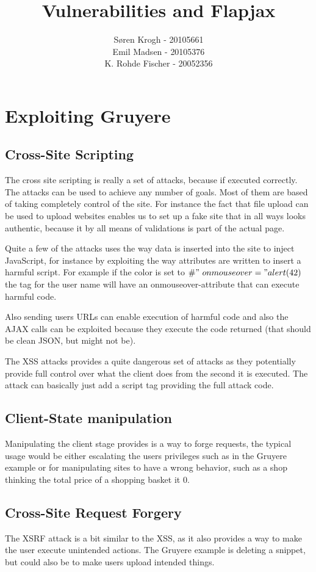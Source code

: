 \documentclass[a4paper,10pt]{article}
\title{Vulnerabilities and Flapjax}
\author{Søren Krogh -  20105661 \\
Emil Madsen - 20105376  \\
K. Rohde Fischer - 20052356\\}
\begin{document}
\maketitle

\section*{Exploiting Gruyere}
\subsection*{Cross-Site Scripting}
The cross site scripting is really a set of attacks, because if
executed correctly.  The attacks can be used to achieve any number of
goals.  Most of them are based of taking completely control of the
site.  For instance the fact that file upload can be used to upload
websites enables us to set up a fake site that in all ways looks
authentic, because it by all means of validations is part of the
actual page.

Quite a few of the attacks uses the way data is inserted into the site
to inject JavaScript, for instance by exploiting the way attributes
are written to insert a harmful script.  For example if the color is
set to $\#"~onmouseover="alert(42)$ the tag for the user name will
have an onmouseover-attribute that can execute harmful code.

Also sending users URLs can enable execution of harmful code and also
the AJAX calls can be exploited because they execute the code returned
(that should be clean JSON, but might not be).

The XSS attacks provides a quite dangerous set of attacks as they
potentially provide full control over what the client does from the
second it is executed.  The attack can basically just add a script tag
providing the full attack code.

\subsection*{Client-State manipulation}
Manipulating the client stage provides is a way to forge requests, the
typical usage would be either escalating the users privileges such as
in the Gruyere example or for manipulating sites to have a wrong
behavior, such as a shop thinking the total price of a shopping basket
it 0.

\subsection*{Cross-Site Request Forgery}
The XSRF attack is a bit similar to the XSS, as it also provides a way
to make the user execute unintended actions.  The Gruyere example is
deleting a snippet, but could also be to make users upload intended
things.  
\end{document}
